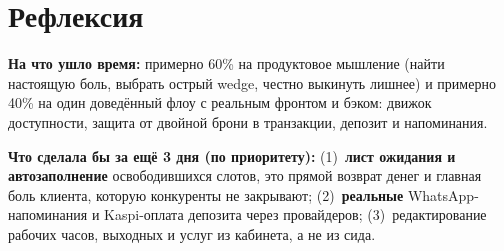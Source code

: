 \documentclass[11pt,a4paper]{article}
\begin{document}
\section*{Рефлексия}

\textbf{На что ушло время:} примерно 60\% на продуктовое мышление (найти настоящую боль, выбрать острый wedge, честно выкинуть лишнее) и примерно 40\% на один доведённый флоу с реальным фронтом и бэком: движок доступности, защита от двойной брони в транзакции, депозит и напоминания.

\textbf{Что сделала бы за ещё 3 дня (по приоритету):} (1)~\textbf{лист ожидания и автозаполнение} освободившихся слотов, это прямой возврат денег и главная боль клиента, которую конкуренты не закрывают; (2)~\textbf{реальные} WhatsApp-напоминания и Kaspi-оплата депозита через провайдеров; (3)~редактирование рабочих часов, выходных и услуг из кабинета, а не из сида.
\end{document}
